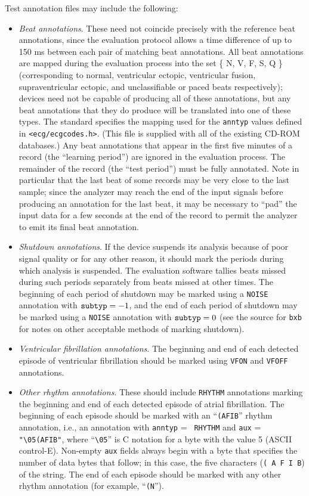 Test annotation files may include the following:
\begin{itemize}
   \item  {\em Beat annotations}.  These need not coincide precisely with the
reference beat annotations, since the evaluation protocol allows a time
difference of up to 150 ms between each pair of matching beat annotations.
All beat annotations are mapped during the evaluation process into the set
\{ N, V, F, S, Q \} (corresponding to normal, ventricular ectopic, ventricular
fusion, supraventricular ectopic, and unclassifiable or paced beats
respectively); devices need not be capable of producing all of these
annotations, but any beat annotations that they do produce will be translated
into one of these types.  The standard specifies the mapping used for the
{\tt anntyp} values defined in {\tt <ecg/ecgcodes.h>}. (This file is
supplied with all of the existing CD-ROM databases.)  Any beat annotations that
appear in the first five minutes of a record (the ``learning period'') are
ignored in the evaluation process.  The remainder of the record (the ``test
period'') must be fully annotated.  Note in particular that the last beat of
some records may be very close to the last sample;  since the analyzer may
reach the end of the input signals before producing an annotation for the last
beat, it may be necessary to ``pad'' the input data for a few seconds at the
end of the record to permit the analyzer to emit its final beat annotation.

   \item {\em Shutdown annotations}.  If the device suspends its analysis
because of poor signal quality or for any other reason, it should mark the
periods during which analysis is suspended.  The evaluation software tallies
beats missed during such periods separately from beats missed at other times.
The beginning of each period of shutdown may be marked using a {\tt NOISE}
annotation with ${\tt subtyp} = -1$, and the end of each period of shutdown
may be marked using a {\tt NOISE} annotation with ${\tt subtyp} = 0$ (see
the source for {\tt bxb} for notes on other acceptable methods of marking
shutdown).

   \item {\em Ventricular fibrillation annotations}.  The beginning and end
of each detected episode of ventricular fibrillation should be marked using
{\tt VFON} and {\tt VFOFF} annotations.

   \item {\em Other rhythm annotations}.  These should include
{\tt RHYTHM} annotations marking the beginning and end of each detected episode
of atrial fibrillation.  The beginning of each episode should be marked with an
``{\tt (AFIB}'' rhythm annotation, i.e., an annotation with {\tt anntyp} = {\tt
RHYTHM} and {\tt aux} = \verb|"\05(AFIB"|, where ``\verb|\05|'' is C notation
for a byte with the value 5 (ASCII control-E).  Non-empty {\tt aux} fields
always begin with a byte that specifies the number of data bytes that follow;
in this case, the five characters ({\tt ( A F I B}) of the string.  The end of
each episode should be marked with any other rhythm annotation (for example,
``{\tt (N}'').


\end{itemize}
